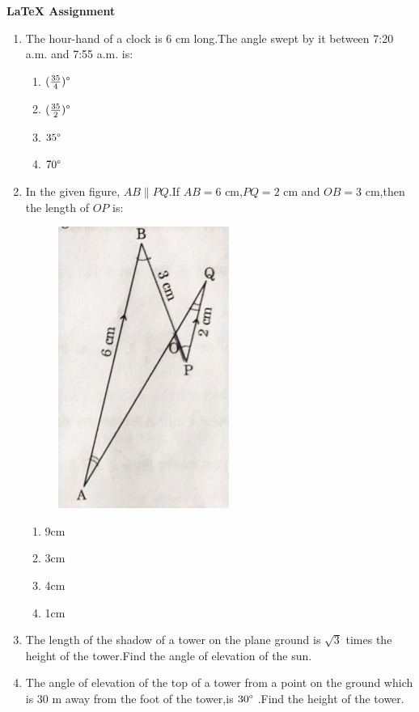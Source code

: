 \documentclass{article}
\begin{document}
\begin{center}
    \textbf{ \LaTeX{} Assignment}
\end{center}

\begin{enumerate}
    \item The hour-hand of a clock is 6 cm long.The angle swept by it between 7:20 a.m. and 7:55 a.m. is:

\begin{enumerate}[label=(\alph*)]
    \item $(\frac{35}{4})\degree$
    \item $(\frac{35}{2})\degree$
    \item $35\degree$
    \item $70\degree$
\end{enumerate}

\item In the given figure, $ AB \parallel PQ $.If $AB=6$ cm,$PQ=2$ cm and $OB=3$ cm,then the length of $OP$ is:

\begin{figure}[h]
    \centering
    \includegraphics[width=0.3\columnwidth]{figs/30_2_1_Q18.png}
    \caption{}
    \label{fig:30_2_1_Q18}
\end{figure}
\begin{enumerate}[label=(\alph*)]
    \item 9cm
    \item 3cm
    \item 4cm 
    \item 1cm
\end{enumerate}

\item The length of the shadow of a tower on the plane ground is $\sqrt{3}$ times the height of the tower.Find the angle of elevation of the sun.

\item  The angle of elevation of the top of a tower from a point on the ground which is 30 m away from the foot of the tower,is $30\degree$ .Find the height of the tower.


\end{enumerate}
\end{document}
